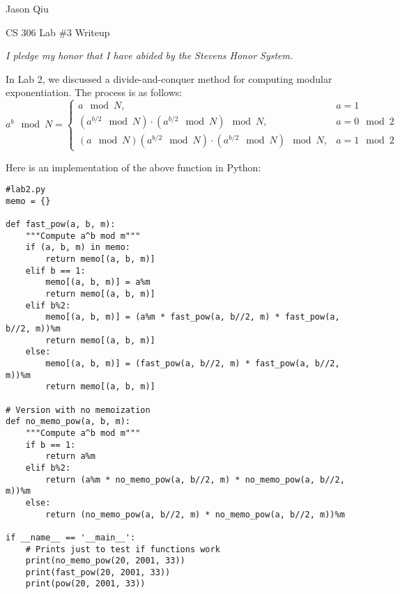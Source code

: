 \documentclass[a4paper,10pt]{article}
\begin{document}
Jason Qiu

CS 306 Lab $\#3$ Writeup

\emph{I pledge my honor that I have abided by the Stevens Honor System.}

In Lab 2, we discussed a divide-and-conquer method for computing modular exponentiation. The process is as follows:
\begin{equation*}
a^b \mod N = 
\begin{cases}
	a \mod N, & a = 1\\
	(a^{b/2} \mod N) \cdot (a^{b/2} \mod N) \mod N, & a = 0 \mod 2\\
	(a \mod N)(a^{b/2} \mod N) \cdot (a^{b/2} \mod N) \mod N, & a = 1 \mod 2
\end{cases}
\end{equation*}

Here is an implementation of the above function in Python:

\begin{lstlisting}
#lab2.py
memo = {}

def fast_pow(a, b, m):
    """Compute a^b mod m"""
    if (a, b, m) in memo:
        return memo[(a, b, m)]
    elif b == 1:
        memo[(a, b, m)] = a%m
        return memo[(a, b, m)]
    elif b%2:
        memo[(a, b, m)] = (a%m * fast_pow(a, b//2, m) * fast_pow(a, b//2, m))%m
        return memo[(a, b, m)]
    else:
        memo[(a, b, m)] = (fast_pow(a, b//2, m) * fast_pow(a, b//2, m))%m
        return memo[(a, b, m)]

# Version with no memoization
def no_memo_pow(a, b, m):
    """Compute a^b mod m"""
    if b == 1:
        return a%m
    elif b%2:
        return (a%m * no_memo_pow(a, b//2, m) * no_memo_pow(a, b//2, m))%m
    else:
        return (no_memo_pow(a, b//2, m) * no_memo_pow(a, b//2, m))%m

if __name__ == '__main__':
	# Prints just to test if functions work
    print(no_memo_pow(20, 2001, 33))
    print(fast_pow(20, 2001, 33))
    print(pow(20, 2001, 33))
\end{lstlisting}
\end{document}
